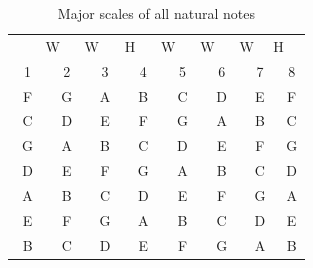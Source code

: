 \begin{table}[h]
	\centering
	\begin{tabular}{*{16}{c}}
		& \multicolumn{2}{P{4mm}}{\large{W}} & \multicolumn{2}{P{4mm}}{\large{W}} & \multicolumn{2}{P{4mm}}{\large{H}} & \multicolumn{2}{P{4mm}}{\large{W}} & \multicolumn{2}{P{4mm}}{\large{W}} & \multicolumn{2}{P{4mm}}{\large{W}} & \multicolumn{2}{P{4mm}}{\large{H}} & \\
		\multicolumn{2}{P{4mm}}{1} & \multicolumn{2}{P{4mm}}{2} & \multicolumn{2}{P{4mm}}{3} & \multicolumn{2}{P{4mm}}{4} & \multicolumn{2}{P{4mm}}{5} & \multicolumn{2}{P{4mm}}{6} & \multicolumn{2}{P{4mm}}{7} & \multicolumn{2}{P{4mm}}{8} \\
		\multicolumn{2}{P{4mm}}{F} & \multicolumn{2}{P{4mm}}{G} & \multicolumn{2}{P{4mm}}{A} & \multicolumn{2}{P{4mm}}{B\flat} & \multicolumn{2}{P{4mm}}{C} & \multicolumn{2}{P{4mm}}{D} & \multicolumn{2}{P{4mm}}{E} & \multicolumn{2}{P{4mm}}{F} \\
		\multicolumn{2}{P{4mm}}{C} & \multicolumn{2}{P{4mm}}{D} & \multicolumn{2}{P{4mm}}{E} & \multicolumn{2}{P{4mm}}{F} & \multicolumn{2}{P{4mm}}{G} & \multicolumn{2}{P{4mm}}{A} & \multicolumn{2}{P{4mm}}{B} & \multicolumn{2}{P{4mm}}{C} \\
		\multicolumn{2}{P{4mm}}{G} & \multicolumn{2}{P{4mm}}{A} & \multicolumn{2}{P{4mm}}{B} & \multicolumn{2}{P{4mm}}{C} & \multicolumn{2}{P{4mm}}{D} & \multicolumn{2}{P{4mm}}{E} & \multicolumn{2}{P{4mm}}{F\sharp} & \multicolumn{2}{P{4mm}}{G} \\
		\multicolumn{2}{P{4mm}}{D} & \multicolumn{2}{P{4mm}}{E} & \multicolumn{2}{P{4mm}}{F\sharp} & \multicolumn{2}{P{4mm}}{G} & \multicolumn{2}{P{4mm}}{A} & \multicolumn{2}{P{4mm}}{B} & \multicolumn{2}{P{4mm}}{C\sharp} & \multicolumn{2}{P{4mm}}{D} \\
		\multicolumn{2}{P{4mm}}{A} & \multicolumn{2}{P{4mm}}{B} & \multicolumn{2}{P{4mm}}{C\sharp} & \multicolumn{2}{P{4mm}}{D} & \multicolumn{2}{P{4mm}}{E} & \multicolumn{2}{P{4mm}}{F\sharp} & \multicolumn{2}{P{4mm}}{G\sharp} & \multicolumn{2}{P{4mm}}{A} \\
		\multicolumn{2}{P{4mm}}{E} & \multicolumn{2}{P{4mm}}{F\sharp} & \multicolumn{2}{P{4mm}}{G\sharp} & \multicolumn{2}{P{4mm}}{A} & \multicolumn{2}{P{4mm}}{B} & \multicolumn{2}{P{4mm}}{C\sharp} & \multicolumn{2}{P{4mm}}{D\sharp} & \multicolumn{2}{P{4mm}}{E} \\
		\multicolumn{2}{P{4mm}}{B} & \multicolumn{2}{P{4mm}}{C\sharp} & \multicolumn{2}{P{4mm}}{D\sharp} & \multicolumn{2}{P{4mm}}{E} & \multicolumn{2}{P{4mm}}{F\sharp} & \multicolumn{2}{P{4mm}}{G\sharp} & \multicolumn{2}{P{4mm}}{A\sharp} & \multicolumn{2}{P{4mm}}{B}
	\end{tabular}
	\caption{Major scales of all natural notes}
	\label{tab:guitar_natural_note_major_scale}
\end{table}

